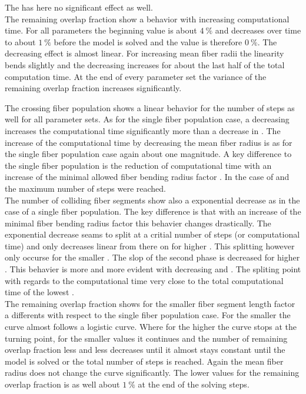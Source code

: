 The \segRadiusFactor{} has here no significant effect as well.
\\
% 
The remaining overlap fraction show a behavior with increasing computational time.
For all parameters the beginning value is about $\SI{4}{\percent}$ and decreases over time to about $\SI{1}{\percent}$ before the model is solved and the value is therefore $\SI{0}{\percent}$.
The decreasing effect is almost linear.
For increasing mean fiber radii \fiberRadiusMean{} the linearity bends slightly and the decreasing increases for about the last half of the total computation time. 
At the end of every parameter set the variance of the remaining overlap fraction increases significantly.
\par
% 
The crossing fiber population shows a linear behavior for the number of steps as well for all parameter sets.
As for the single fiber population case, a decreasing \fiberRadiusMean{} increases the computational time significantly more than a decrease in \segLength{}.
The increase of the computational time by decreasing the mean fiber radius is as for the single fiber population case again about one magnitude.
A key difference to the single fiber population is the reduction of computational time with an increase of the minimal allowed fiber bending radius factor \segRadiusFactor{}.
In the case of \dummy{} and \dummy{} the maximum number of steps were reached.
\\
The number of colliding fiber segments show also a exponential decrease as in the case of a single fiber population.
The key difference is that with an increase of the minimal fiber bending radius factor \segRadiusFactor{} this behavier changes drastically.
The exponential decrease seams to split at a critial number of steps (or computational time) and only decreases linear from there on for higher \segRadiusFactor{}.
This splitting however only occurse for the smaller \segLengthFactor{}.
The slop of the second phase is decreased for higher \segRadiusFactor{}.
This behavier is more and more evident with decreasing \fiberRadiusMean{} and \segLengthFactor{}.
The spliting point with regards to the computational time very close to the total computational time of the lowest \segRadiusFactor{}.
\\
The remaining overlap fraction shows for the smaller fiber segment length factor  \segLengthFactor{} a differents with respect to the single fiber population case.
For the smaller \segLengthFactor{} the curve almost follows a logistic curve.
Where for the higher \segLengthFactor{} the curve stops at the turning point, for the smaller values it continues and the number of remaining overlap fraction less and less decreases until it almost stays constant until the model is solved or the total number of steps is reached.
Again the mean fiber radius \fiberRadiusMean{} does not change the curve significantly.
The lower values for the remaining overlap fraction is as well about $\SI{1}{\percent}$ at the end of the solving steps.
% 
% 
% 

